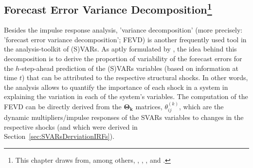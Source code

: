 \documentclass[a4paper,11pt,listof=nochaptergap,oneside,pointednumbers,bibtotoc,bigheadings,liststotoc,hidelinks]{scrbook}
\theoremstyle{mysatz}
\theoremstyle{mydefinition}
\theoremstyle{mytheorem}
\theoremstyle{mybemerkung}
\newcommand{\vect}[1]{\boldsymbol{\mathbf{#1}}}
\begin{document}
\subsection[Forecast Error Variance Decomposition]{Forecast Error Variance Decomposition\footnote{This chapter draws from, among others, \citet{lutkepohl:10}, \citet{lutkepohl:05}, \citet{lutkepohlkilian:17}, \citet{zivot:00} and \citet{sims:11}.}}
\label{sec:FEVDTheory}
Besides the impulse response analysis, 'variance decomposition' (more precisely: 'forecast error variance decomposition'; FEVD) is another frequently used tool in the analysis-toolkit of (S)VARs. As aptly formulated by \citet{zivot:00}, the idea behind this decomposition is to derive the proportion of variability of the forecast errors for the $h$-step-ahead prediction of the (S)VARs variables (based on information at time $t$) that can be attributed to the respective structural shocks. In other words, the analysis allows to quantify the importance of each shock in a system in explaining the variation in each of the system's variables.  The computation of the FEVD can be directly derived from the $\vect{\Theta_k}$ matrices, $\theta_{ij}^{(k)}$, which are the dynamic multipliers/impulse responses of the SVARs variables to changes in the respective shocks (and which were derived in Section~\ref{sec:SVARsDerviationIRFs}).
\end{document}

